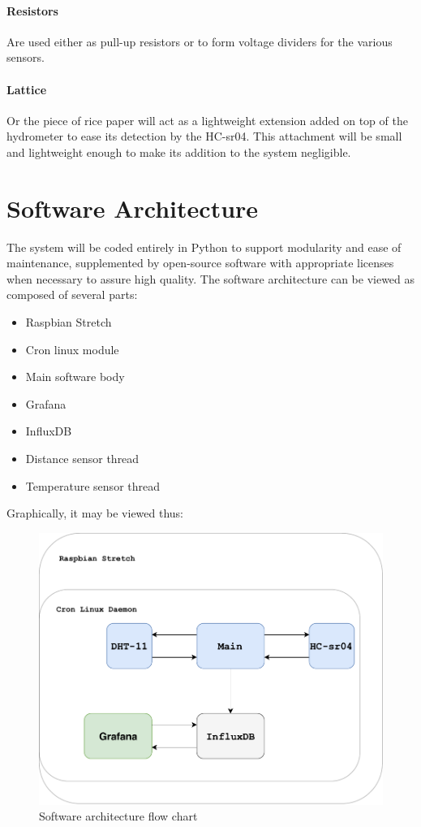 \documentclass[twoside]{ctuthesis}
\theoremstyle{plain}
\theoremstyle{definition}
\theoremstyle{note}
\begin{document}
\paragraph{Resistors} Are used either as pull-up resistors or to form voltage dividers for the various sensors.
\paragraph{Lattice} Or the piece of rice paper will act as a lightweight extension added on top of the hydrometer to ease its detection by the HC-sr04. This attachment will be small and lightweight enough to make its addition to the system negligible.
\newpage
\section{Software Architecture}
The system will be coded entirely in Python to support modularity and ease of maintenance, supplemented by open-source software with appropriate licenses when necessary to assure high quality. The software architecture can be viewed as composed of several parts:\\

\begin{itemize}
	\item Raspbian Stretch
	\item Cron linux module
	\item Main software body
	\item Grafana 
	\item InfluxDB
	\item Distance sensor thread
	\item Temperature sensor thread
\end{itemize}

Graphically, it may be viewed thus:

\begin{figure}[H]
	\centering
	\includegraphics[width = \textwidth]{System_architecture}
	\caption{Software architecture flow chart}
\end{figure}
\end{document}
